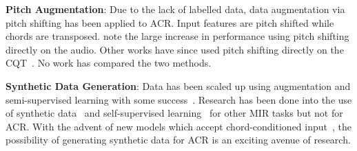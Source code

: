 \textbf{Pitch Augmentation}: Due to the lack of labelled data, data augmentation via pitch shifting has been applied to ACR. Input features are pitch shifted while chords are transposed. \citet{StructuredTraining} note the large increase in performance using pitch shifting directly on the audio. Other works have since used pitch shifting directly on the CQT~\citep{ACRLargeVocab1}. No work has compared the two methods.

\textbf{Synthetic Data Generation}: Data has been scaled up using augmentation and semi-supervised learning with some success~\citep{ScalingUpSemiSupervisedLearning}. Research has been done into the use of synthetic data~\citep{MusicGenTrainingData,AnnotationFreeSyntheticData} and self-supervised learning~\citep{MERTSupervisedLearning} for other MIR tasks but not for ACR. With the advent of new models which accept chord-conditioned input~\citep{MusiConGen}, the possibility of generating synthetic data for ACR is an exciting avenue of research.






